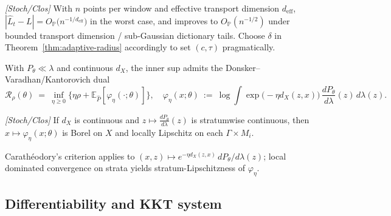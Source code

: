 \begin{remark}\label{rem:w1-rates}
\emph{[\textup{Stoch/Clos}]}
With $n$ points per window and effective transport dimension $d_{\mathrm{eff}}$,
\(
|\hat L_t - L| = O_{\mathbb P}\!\big(n^{-1/d_{\mathrm{eff}}}\big)
\)
in the worst case, and improves to
\(
O_{\mathbb P}(n^{-1/2})
\)
under bounded transport dimension / sub-Gaussian dictionary tails. 
Choose $\delta$ in Theorem~\ref{thm:adaptive-radius} accordingly to set $(c,\tau)$ pragmatically.
\end{remark}


With $P_\theta\ll\lambda$ and continuous $d_X$, the inner sup admits the Donsker--Varadhan/Kantorovich dual
\[
\mathcal R_\rho(\theta)
\ =\ \inf_{\eta\ge 0}\Big\{\eta\rho+\mathbb E_{\hat P}[\varphi_\eta(\cdot;\theta)]\Big\},
\quad
\varphi_\eta(x;\theta)\ :=\ \log \int \exp\!\big(-\eta d_X(z,x)\big)\,\frac{dP_\theta}{d\lambda}(z)\,d\lambda(z).
\]

\begin{lemma}\label{lem:varphi-meas}
\emph{[\textup{Stoch/Clos}]} If $d_X$ is continuous and $z\mapsto \frac{dP_\theta}{d\lambda}(z)$ is stratumwise continuous, then $x\mapsto \varphi_\eta(x;\theta)$ is Borel on $X$ and locally Lipschitz on each $\Gamma\times M_i$.
\begin{proofsketch}
Carath\'eodory's criterion applies to $(x,z)\mapsto e^{-\eta d_X(z,x)}\,dP_\theta/d\lambda(z)$; local dominated convergence on strata yields stratum-Lipschitzness of $\varphi_\eta$.
\end{proofsketch}
\end{lemma}

\subsection{Differentiability and KKT system}\label{subsec:kkt}

